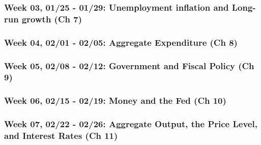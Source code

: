 \documentclass[11pt,]{article}
\begin{document}
\hypertarget{week-03-0125---0129-unemployment-inflation-and-long-run-growth-ch-7}{%
\subsubsection*{Week 03, 01/25 - 01/29: Unemployment inflation and Long-run growth (Ch 7)}\label{week-03-0125---0129-unemployment-inflation-and-long-run-growth-ch-7}}

\hypertarget{week-04-0201---0205-aggregate-expenditure-ch-8}{%
\subsubsection*{Week 04, 02/01 - 02/05: Aggregate Expenditure (Ch 8)}\label{week-04-0201---0205-aggregate-expenditure-ch-8}}

\hypertarget{week-05-0208---0212-government-and-fiscal-policy-ch-9}{%
\subsubsection*{Week 05, 02/08 - 02/12: Government and Fiscal Policy (Ch 9)}\label{week-05-0208---0212-government-and-fiscal-policy-ch-9}}

\hypertarget{week-06-0215---0219-money-and-the-fed-ch-10}{%
\subsubsection*{Week 06, 02/15 - 02/19: Money and the Fed (Ch 10)}\label{week-06-0215---0219-money-and-the-fed-ch-10}}

\hypertarget{week-07-0222---0226-aggregate-output-the-price-level-and-interest-rates-ch-11}{%
\subsubsection*{Week 07, 02/22 - 02/26: Aggregate Output, the Price Level, and Interest Rates (Ch 11)}\label{week-07-0222---0226-aggregate-output-the-price-level-and-interest-rates-ch-11}}
\end{document}
